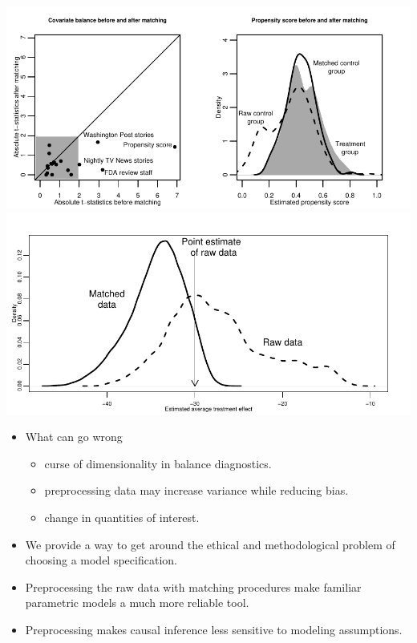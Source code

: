 \documentclass[20pt,landscape,pdftex]{foils}
\begin{document}
\hypersetup{pdfpagetransition=Replace}

\begin{center}
  \includegraphics[scale=1.2]{figs/fdabal}\pause \\
  \includegraphics[scale=1.2]{figs/fdadens}\pause
\end{center}



\hypersetup{pdfpagetransition=Replace}

\begin{itemize}
\item What can go wrong\pause
  \begin{itemize}
  \item curse of dimensionality in balance diagnostics.\pause
  \item preprocessing data may increase variance while reducing
    bias.\pause 
  \item change in quantities of interest.\pause
  \end{itemize}
\item We provide a way to get around the ethical and methodological
  problem of choosing a model specification.\pause
\item Preprocessing the raw data with matching procedures make
  familiar parametric models a much more reliable tool.\pause

\item Preprocessing makes causal inference less sensitive to modeling
  assumptions.\pause 
\end{itemize}
\end{document}
